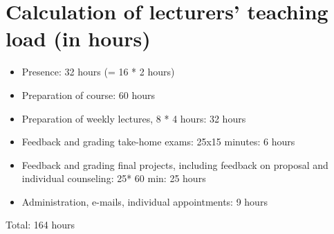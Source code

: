 \documentclass[a4paper,12pt]{report}
\begin{document}
\chapter{Calculation of lecturers' teaching load (in hours)}
\begin{itemize}
\item Presence: 32 hours (= 16 * 2 hours)
\item Preparation of course: 60 hours
\item Preparation of weekly lectures, 8 * 4 hours: 32 hours
\item Feedback and grading take-home exams: 25x15 minutes: 6 hours
\item Feedback and grading final projects, including feedback on proposal and individual counseling: 25* 60 min: 25 hours 
\item Administration, e-mails, individual appointments: 9 hours
\end{itemize}
Total: 164 hours

 
 



 
 
 
\end{document}
